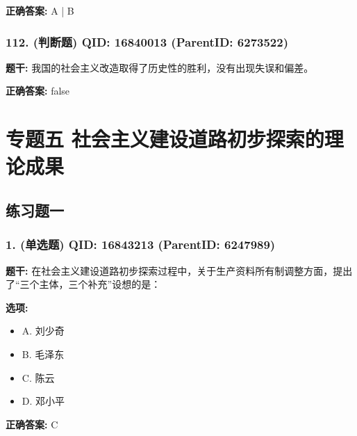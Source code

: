\documentclass[12pt,UTF8]{ctexart}
\begin{document}
\textbf{正确答案:}
A | B

\vspace{0.3em}\hrulefill\vspace{0.7em}

\subsubsection*{112. (判断题) \small QID: 16840013 (ParentID: 6273522)}

\textbf{题干:}
我国的社会主义改造取得了历史性的胜利，没有出现失误和偏差。



\textbf{正确答案:}
false

\vspace{0.3em}\hrulefill\vspace{0.7em}

\section*{专题五 社会主义建设道路初步探索的理论成果}
\hrulefill

\subsection*{练习题一}

\subsubsection*{1. (单选题) \small QID: 16843213 (ParentID: 6247989)}

\textbf{题干:}
在社会主义建设道路初步探索过程中，关于生产资料所有制调整方面，提出了“三个主体，三个补充”设想的是：



\textbf{选项:}
\begin{itemize}[leftmargin=*]

  \item A. 刘少奇

  \item B. 毛泽东

  \item C. 陈云

  \item D. 邓小平

\end{itemize}

\textbf{正确答案:}
C

\vspace{0.3em}\hrulefill\vspace{0.7em}
\end{document}
